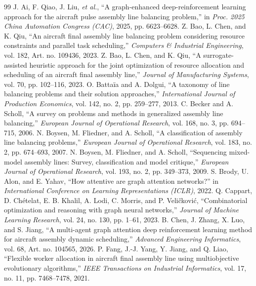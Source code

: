 \documentclass[journal,10pt]{IEEEtran}
\begin{document}
\begin{thebibliography}{99}
\small
{} J. Ai, F. Qiao, J. Liu, \emph{et al.}, ``A graph-enhanced deep-reinforcement learning approach for the aircraft pulse assembly line balancing problem,'' in \emph{Proc. 2025 China Automation Congress (CAC)}, 2025, pp. 6623--6628.
 Z. Bao, L. Chen, and K. Qiu, ``An aircraft final assembly line balancing problem considering resource constraints and parallel task scheduling,'' \emph{Computers \& Industrial Engineering}, vol. 182, Art. no. 109436, 2023.
 Z. Bao, L. Chen, and K. Qiu, ``A surrogate-assisted heuristic approach for the joint optimization of resource allocation and scheduling of an aircraft final assembly line,'' \emph{Journal of Manufacturing Systems}, vol. 70, pp. 102--116, 2023.
 O. Battaïa and A. Dolgui, ``A taxonomy of line balancing problems and their solution approaches,'' \emph{International Journal of Production Economics}, vol. 142, no. 2, pp. 259--277, 2013.
 C. Becker and A. Scholl, ``A survey on problems and methods in generalized assembly line balancing,'' \emph{European Journal of Operational Research}, vol. 168, no. 3, pp. 694--715, 2006.
 N. Boysen, M. Fliedner, and A. Scholl, ``A classification of assembly line balancing problems,'' \emph{European Journal of Operational Research}, vol. 183, no. 2, pp. 674--693, 2007.
 N. Boysen, M. Fliedner, and A. Scholl, ``Sequencing mixed-model assembly lines: Survey, classification and model critique,'' \emph{European Journal of Operational Research}, vol. 193, no. 2, pp. 349--373, 2009.
 S. Brody, U. Alon, and E. Yahav, ``How attentive are graph attention networks?'' in \emph{International Conference on Learning Representations (ICLR)}, 2022.
 Q. Cappart, D. Chételat, E. B. Khalil, A. Lodi, C. Morris, and P. Veličković, ``Combinatorial optimization and reasoning with graph neural networks,'' \emph{Journal of Machine Learning Research}, vol. 24, no. 130, pp. 1--61, 2023.
 B. Chen, J. Zhang, X. Luo, and S. Jiang, ``A multi-agent graph attention deep reinforcement learning method for aircraft assembly dynamic scheduling,'' \emph{Advanced Engineering Informatics}, vol. 68, Art. no. 104565, 2026.
 P. Fang, J.-J. Yang, Y. Jiang, and Q. Liao, ``Flexible worker allocation in aircraft final assembly line using multiobjective evolutionary algorithms,'' \emph{IEEE Transactions on Industrial Informatics}, vol. 17, no. 11, pp. 7468--7478, 2021.

\end{thebibliography}
\end{document}
